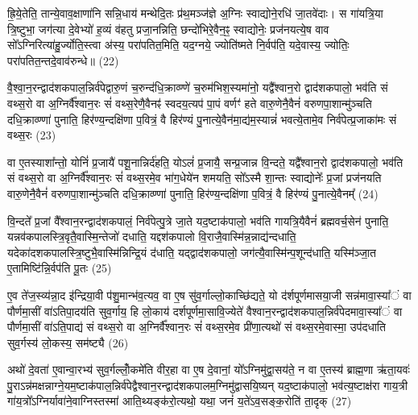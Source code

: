 ह्रि॒ये॒तेति॒ तान्ये॒वाव॒क्षाणा॑नि सन्नि॒धाय॑ मन्थेदि॒तः प्र॑थ॒मञ्ज॑ज्ञे अ॒ग्निः स्वाद्योने॒रधि॑ जा॒तवे॑दाः। स गा॑यत्रि॒या त्रि॒ष्टुभा॒ जग॑त्या दे॒वेभ्यो॑ ह॒व्यं व॑हतु प्रजा॒नन्निति॒ छन्दो॑भिरे॒वैन॒ꣴ॒ स्वाद्योनेः॒ प्रज॑नयत्ये॒ष वाव सो᳚\-ऽग्निरित्या॑हु॒र्ज्योति॒स्त्वा अ॑स्य॒ परा॑पतित॒मिति॒ यद॒ग्नये॒ ज्योति॑ष्मते नि॒र्वप॑ति॒ यदे॒वास्य॒ ज्योतिः॒ परा॑पतित॒न्तदे॒वाव॑रुन्धे॥ (22)

{\anuvakamend[{क॒रो॒त्य॒न्ना॒दो द॑धाति॒ यद॒ग्नये॒ शुच॑ये॒ चक्षु॑रे॒वास्मि॒न्तेन॑ दधाति करोति॒ वाजं॒ यज॑मान॒मुदे॒वास्य॒ षट्च॑॥४॥}]}

वै॒श्वा॒न॒रन्द्वाद॑शकपाल॒न्निर्व॑पेद्वारु॒णं च॒रुन्द॑धि॒क्राव्ण्णे॑ च॒रुम॑भिश॒स्यमा॑नो॒ यद्वै᳚श्वान॒रो द्वाद॑शकपालो॒ भव॑ति सं वथ्स॒रो वा अ॒ग्निर्वै᳚श्वान॒रः सं॑ वथ्स॒रेणै॒वैनꣴ॑ स्वदय॒त्यप॑ पा॒पं वर्णꣳ॑ हते वारु॒णेनै॒वैनं॑ वरुणपा॒शान्मु॑ञ्चति दधि॒क्राव्ण्णा॑ पुनाति॒ हिर॑ण्य॒न्दक्षि॑णा प॒वित्रं॒ वै हिर॑ण्यं पु॒नात्ये॒वैन॑मा॒द्य॑म॒स्यान्नं॑ भवत्ये॒तामे॒व निर्व॑पेत्प्र॒जाका॑मः सं वथ्स॒रः (23)

वा ए॒तस्याशा᳚न्तो॒ योनिं॑ प्र॒जायै॑ पशू॒नान्निर्द॑हति॒ यो\-ऽलं॑ प्र॒जायै॒ सन्प्र॒जान्न वि॒न्दते॒ यद्वै᳚श्वान॒रो द्वाद॑शकपालो॒ भव॑ति सं वथ्स॒रो वा अ॒ग्निर्वै᳚श्वान॒रः सं॑ वथ्स॒रमे॒व भा॑ग॒धेये॑न शमयति॒ सो᳚\-ऽस्मै शा॒न्तः स्वाद्योनेः᳚ प्र॒जां प्रज॑नयति वारु॒णेनै॒वैनं॑ वरुणपा॒शान्मु॑ञ्चति दधि॒क्राव्ण्णा॑ पुनाति॒ हिर॑ण्य॒न्दक्षि॑णा प॒वित्रं॒ वै हिर॑ण्यं पु॒नात्ये॒वैनम्᳚ (24)

वि॒न्दते᳚ प्र॒जां वै᳚श्वान॒रन्द्वाद॑शकपालं॒ निर्व॑पेत्पु॒त्रे जा॒ते यद॒ष्टाक॑पालो॒ भव॑ति गायत्रि॒यैवैनं॑ ब्रह्मवर्च॒सेन॑ पुनाति॒ यन्नव॑कपालस्त्रि॒वृतै॒वास्मि॒न्तेजो॑ दधाति॒ यद्दश॑कपालो वि॒राजै॒वास्मि॑न्न॒न्नाद्य॑न्दधाति॒ यदेका॑दशकपालस्त्रि॒ष्टुभै॒वा\-स्मि॑न्निन्द्रि॒यं द॑धाति॒ यद्द्वाद॑शकपालो॒ जग॑त्यै॒वास्मि॑न्प॒शून्द॑धाति॒ यस्मि॑ञ्जा॒त ए॒तामिष्टि॑न्नि॒र्वप॑ति पू॒तः (25)

ए॒व ते॑ज॒स्व्य॑न्ना॒द इ॑न्द्रिया॒वी प॑शु॒मान्भ॑व॒त्यव॒ वा ए॒ष सु॑व॒र्गाल्लो॒काच्छि॑द्यते॒ यो द॑र्\mbox{}शपूर्णमासया॒जी सन्न॑मावा॒स्या᳚ं वा पौर्णमा॒सीं वा॑\-ऽतिपा॒दय॑ति सुव॒र्गाय॒ हि लो॒काय॑ दर्\mbox{}शपूर्णमा॒सावि॒ज्येते॑ वैश्वान॒रन्द्वाद॑श\-कपाल॒न्निर्व॑पेदमावा॒स्या᳚ं वा पौर्णमा॒सीं वा॑\-ऽति॒पाद्य॑ सं वथ्स॒रो वा अ॒ग्निर्वै᳚श्वान॒रः सं॑ वथ्स॒रमे॒व प्री॑णा॒त्यथो॑ सं वथ्स॒रमे॒वास्मा॒ उप॑दधाति सुव॒र्गस्य॑ लो॒कस्य॒ सम॑ष्ट्यै (26)

अथो॑ दे॒वता॑ ए॒वान्वा॒रभ्य॑ सुव॒र्गल्लोँ॒कमे॑ति वीर॒हा वा ए॒ष दे॒वानां॒ यो᳚\-ऽग्निमु॑द्वा॒सय॑ते॒ न वा ए॒तस्य॑ ब्राह्म॒णा ऋ॑ता॒यवः॑ पु॒रा\-ऽन्न॑मक्षन्नाग्ने॒यम॒ष्टाक॑पाल॒न्निर्व॑पेद्वैश्वान॒रन्द्वाद॑शकपालम॒ग्निमु॑द्वासयि॒ष्यन् यद॒ष्टाक॑पालो॒ भव॑त्य॒ष्टाक्ष॑रा गाय॒त्री गा॑य॒त्रो᳚\-ऽग्निर्यावा॑ने॒वाग्निस्तस्मा॑ आति॒थ्यङ्क॑रो॒त्यथो॒ यथा॒ जनं॑ य॒ते॑\-ऽव॒सङ्क॒रोति॑ ता॒दृक् (27)

